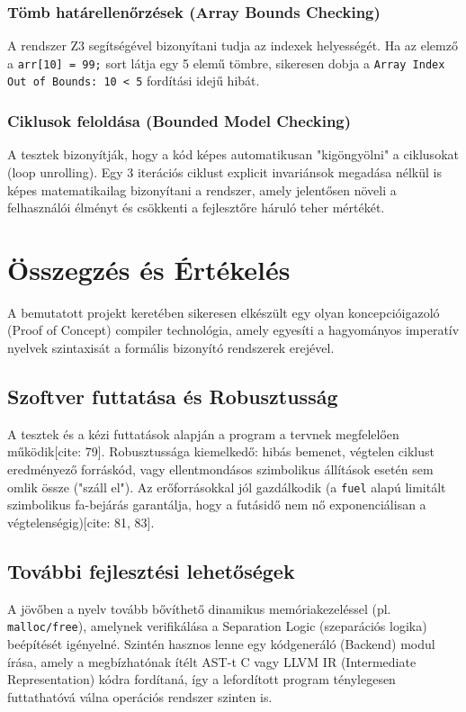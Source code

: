 \documentclass[
    hungarian,
    parspace
]{elteikthesis}
\begin{document}
\subsection{Tömb határellenőrzések (Array Bounds Checking)}
A rendszer Z3 segítségével bizonyítani tudja az indexek helyességét. Ha az elemző a \texttt{arr[10] = 99;} sort látja egy 5 elemű tömbre, sikeresen dobja a \texttt{Array Index Out of Bounds: 10 < 5} fordítási idejű hibát.

\subsection{Ciklusok feloldása (Bounded Model Checking)}
A tesztek bizonyítják, hogy a kód képes automatikusan "kigöngyölni" a ciklusokat (loop unrolling). Egy 3 iterációs ciklust explicit invariánsok megadása nélkül is képes matematikailag bizonyítani a rendszer, amely jelentősen növeli a felhasználói élményt és csökkenti a fejlesztőre háruló teher mértékét.

\chapter{Összegzés és Értékelés}
A bemutatott projekt keretében sikeresen elkészült egy olyan koncepcióigazoló (Proof of Concept) compiler technológia, amely egyesíti a hagyományos imperatív nyelvek szintaxisát a formális bizonyító rendszerek erejével.

\section{Szoftver futtatása és Robusztusság}
A tesztek és a kézi futtatások alapján a program a tervnek megfelelően működik[cite: 79]. Robusztussága kiemelkedő: hibás bemenet, végtelen ciklust eredményező forráskód, vagy ellentmondásos szimbolikus állítások esetén sem omlik össze ("száll el"). Az erőforrásokkal jól gazdálkodik (a \texttt{fuel} alapú limitált szimbolikus fa-bejárás garantálja, hogy a futásidő nem nő exponenciálisan a végtelenségig)[cite: 81, 83].

\section{További fejlesztési lehetőségek}
A jövőben a nyelv tovább bővíthető dinamikus memóriakezeléssel (pl. \texttt{malloc/free}), amelynek verifikálása a Separation Logic (szeparációs logika) beépítését igényelné. Szintén hasznos lenne egy kódgeneráló (Backend) modul írása, amely a megbízhatónak ítélt AST-t C vagy LLVM IR (Intermediate Representation) kódra fordítaná, így a lefordított program ténylegesen futtathatóvá válna operációs rendszer szinten is.

\end{document}
